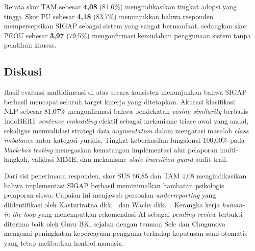 \documentclass[conference]{IEEEtran}
\begin{document}
\begin{table}[htbp]
\caption{Hasil TAM (n = 23)}
\label{tab:tam_hasil}
\begin{center}
\end{center}
\end{table}

Rerata skor TAM sebesar \textbf{4,08} (81,6\%) mengindikasikan tingkat adopsi yang tinggi. Skor PU sebesar \textbf{4,18} (83,7\%) menunjukkan bahwa responden mempersepsikan SIGAP sebagai sistem yang sangat bermanfaat, sedangkan skor PEOU sebesar \textbf{3,97} (79,5\%) mengonfirmasi kemudahan penggunaan sistem tanpa pelatihan khusus.

\subsection{Diskusi}

Hasil evaluasi multidimensi di atas secara konsisten menunjukkan bahwa SIGAP berhasil mencapai seluruh target kinerja yang ditetapkan. Akurasi klasifikasi NLP sebesar 81,07\% mengonfirmasi bahwa pendekatan \textit{cosine similarity} berbasis IndoBERT \textit{sentence embedding} efektif sebagai mekanisme triase awal yang andal, sekaligus memvalidasi strategi \textit{data augmentation} dalam mengatasi masalah \textit{class imbalance} antar kategori yuridis. Tingkat keberhasilan fungsional 100,00\% pada \textit{black-box testing} menegaskan kematangan implementasi alur pelaporan multi-langkah, validasi MIME, dan mekanisme \textit{state transition guard} audit trail.

Dari sisi penerimaan responden, skor SUS 66,85 dan TAM 4,08 mengindikasikan bahwa implementasi SIGAP berhasil meminimalkan hambatan psikologis pelaporan siswa. Capaian ini menjawab persoalan \textit{underreporting} yang diidentifikasi oleh Kasturiratna dkk.~\cite{kasturiratna2025} dan Wachs dkk.~\cite{wachs2022}. Kerangka kerja \textit{human-in-the-loop} yang menempatkan rekomendasi AI sebagai \textit{pending review} terbukti diterima baik oleh Guru BK, sejalan dengan temuan Sele dan Chugunova~\cite{sele2024} mengenai peningkatan kepercayaan pengguna terhadap keputusan semi-otomatis yang tetap melibatkan kontrol manusia.
\end{document}
